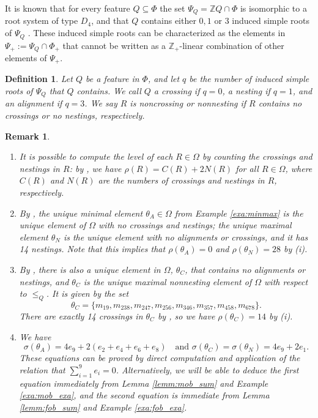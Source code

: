 \documentclass[10pt,a4paper]{amsart}
\newtheorem{defn}[theorem]{Definition}
\newtheorem{rmk}[theorem]{Remark}
\numberwithin{equation}{section}
\newcommand{\Z}{{\mathbb Z}}
\newcommand{\ob}{\Omega}
\newcommand{\se}{\subseteq}
\begin{document}
It is known that for every feature $Q\se \Phi$ the set $\Psi_{Q}=\Z Q\cap \Phi$
is isomorphic to a root system of type $D_4$, and that $Q$ contains either $0,1$
or $3$ induced simple roots of $\Psi_Q$ \cite[Remark 2.14]{gx6}. These induced
simple roots can be characterized as the elements in $\Psi_+:=\Psi_Q\cap\Phi_+$
that cannot be written as a $\Z_+$-linear combination of other elements of
$\Psi_+$.

\begin{defn} \label{def:cna} 
  Let $Q$ be a feature in $\Phi$, and let $q$ be the number of induced simple
  roots of $\Psi_Q$ that $Q$ contains. We call $Q$ a \emph{crossing} if $q=0$, a
  \emph{nesting} if $q=1$, and an \emph{alignment} if $q=3$. We say $R$ is
  \emph{noncrossing} or \emph{nonnesting} if $R$ contains no crossings or no
  nestings, respectively. 
\end{defn}

\begin{rmk}
\label{rmk:theta_C}
\begin{enumerate}
\item It is possible to compute the level of each $R\in \ob$ by counting the
  crossings and nestings in $R$: by \cite[Corollary 4.2]{gx6}, we have
  $\rho(R)=C(R)+2N(R)$ for all $R\in \ob$, where $C(R)$ and $N(R)$ are the
  numbers of crossings and nestings in $R$, respectively.
\item By \cite[Proposition 4.11, Proposition 6.9]{gx5}, the unique minimal
  element $\theta_A\in \ob$ from Example \ref{exa:minmax} is the unique element
  of $\ob$ with no crossings and nestings; the unique maximal element $\theta_N$
  is the unique element with no alignments or crossings, and it has 14 nestings.
  Note that this implies that $\rho(\theta_A)=0$ and $\rho(\theta_N)=28$ by (i). 
\item By \cite[Proposition 5.2 (iii), Proposition 6.9]{gx5}, there is also a
  unique element in $\ob$, $\theta_C$, that contains no
  alignments or nestings, and $\theta_C$ is the unique maximal nonnesting
  element of $\ob$ with respect to $\le_Q$. It is given by the set
\begin{equation*}
\label{eq:theta_C}
\theta_C=\{m_{19}, m_{238}, m_{247}, m_{256}, m_{346}, m_{357}, m_{458}, m_{678}\}.
\end{equation*}
There are exactly 14 crossings in $\theta_C$ by \cite[Corollary 3.19]{gx5}, so
we have $\rho(\theta_C)=14$ by (i). 

\item We have 
  \begin{equation}
  \label{eq:theta_sums}
  \sigma(\theta_A)=4e_9+2(e_2+e_4+e_6+e_8) \quad \text{and }
  \sigma(\theta_C)=\sigma(\theta_N)=4e_9+2e_1.
  \end{equation}
These equations can be proved by direct computation and application of the
relation that $\sum_{i=1}^9e_i=0$. Alternatively, we will be able to deduce the
first equation immediately from Lemma \ref{lemm:mob_sum} and Example
\ref{exa:mob_exa}, and the second equation is immediate from Lemma
\ref{lemm:fob_sum} and Example \ref{exa:fob_exa}.  
\end{enumerate}
\end{rmk}
\end{document}
